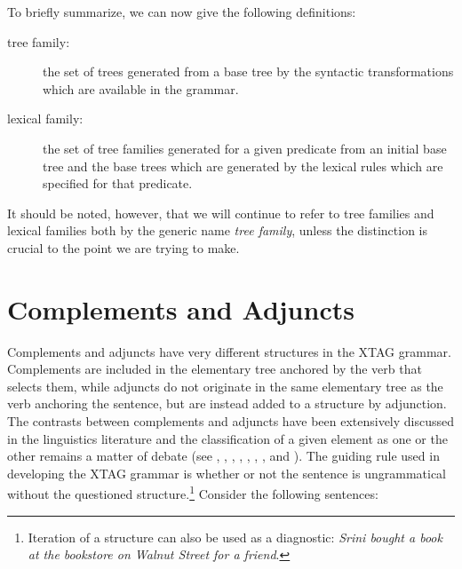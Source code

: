 To briefly summarize, we can now give the following definitions:

\begin{description}
\item[tree family:] the set of trees generated from a base tree by the
syntactic transformations which are available in the grammar.

\item[lexical family:] the set of tree families generated for a given
predicate from an initial base tree and the base trees which are
generated by the lexical rules which are specified for that predicate.

\end{description}

It should be noted, however, that we will continue to refer to tree families
and lexical families both by the generic name {\it tree family}, unless the
distinction is crucial to the point we are trying to make.

\section{Complements and Adjuncts}
\label{compl-adj}

Complements and adjuncts have very different structures in the XTAG grammar.
Complements are included in the elementary tree anchored by the verb that
selects them, while adjuncts do not originate in the same elementary tree as
the verb anchoring the sentence, but are instead added to a structure by
adjunction.  The contrasts between complements and adjuncts have been
extensively discussed in the linguistics literature and the classification of a
given element as one or the other remains a matter of debate (see
\cite{rizzi90},
\cite{larson88}, \cite{jackendoff90}, \cite{larson90}, \cite{cinque90}, 
\cite{obernauer84}, \cite{lasnik-saito84}, and \cite{chomsky86}).  The guiding
rule used in developing the XTAG grammar is whether or not the sentence is
ungrammatical without the questioned structure.\footnote{Iteration of a
structure can also be used as a diagnostic: {\it Srini bought a book at the
bookstore on Walnut Street for a friend}.} Consider the following
sentences:


